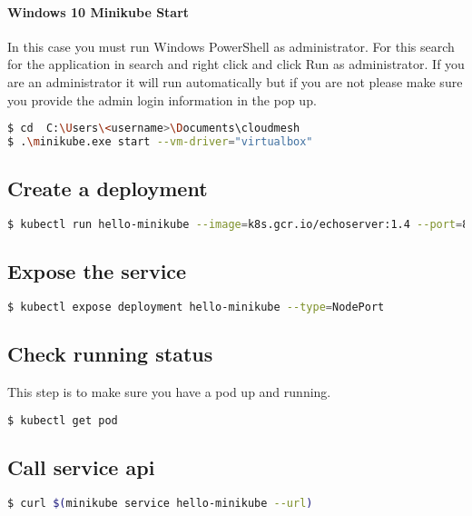 \paragraph{Windows 10 Minikube Start}

In this case you must run Windows PowerShell as administrator. For
this search for the application in search and right click and click Run
as administrator. If you are an administrator it will run automatically
but if you are not please make sure you provide the admin login
information in the pop up.

\begin{lstlisting}[language=bash]
$ cd  C:\Users\<username>\Documents\cloudmesh
$ .\minikube.exe start --vm-driver="virtualbox"
\end{lstlisting}

\subsection{Create a deployment}

\begin{lstlisting}[language=bash]
$ kubectl run hello-minikube --image=k8s.gcr.io/echoserver:1.4 --port=8080
\end{lstlisting}

\subsection{Expose the service}

\begin{lstlisting}[language=bash]
$ kubectl expose deployment hello-minikube --type=NodePort
\end{lstlisting}

\subsection{Check running status}

This step is to make sure you have a pod up and running.

\begin{lstlisting}[language=bash]
$ kubectl get pod
\end{lstlisting}

\subsection{Call service api}

\begin{lstlisting}[language=bash]
$ curl $(minikube service hello-minikube --url)
\end{lstlisting}

